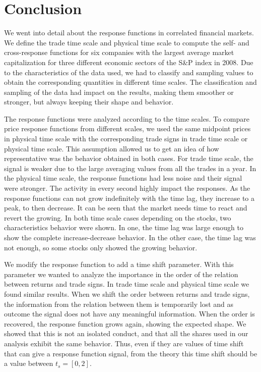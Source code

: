 \section{Conclusion}\label{sec:conclusion}

We went into detail about the response functions in correlated financial
markets. We define the trade time scale and physical time scale to compute the
self- and cross-response functions for six companies with the largest average
market capitalization for three different economic sectors of the S\&P index
in 2008.
Due to the characteristics of the data used, we had to classify and sampling
values to obtain the corresponding quantities in different time scales.
The classification and sampling of the data had impact on the results, making
them smoother or stronger, but always keeping their shape and behavior.

The response functions were analyzed according to the time scales. To compare
price response functions from different scales, we used the same midpoint
prices in physical time scale with the corresponding trade signs in trade time
scale or physical time scale. This assumption allowed us to get an idea of how
representative was the behavior obtained in both cases. For trade time scale,
the signal is weaker due to the large averaging values from all the trades in a
year. In the physical time scale, the response functions had less noise and
their signal were stronger. The activity in every second highly impact the
responses. As the response functions can not grow indefinitely with the time
lag, they increase to a peak, to then decrease. It can be seen that the market
needs time to react and revert the growing. In both time scale cases depending
on the stocks, two characteristics behavior were shown. In one, the time lag
was large enough to show the complete increase-decrease behavior. In the other
case, the time lag was not enough, so some stocks only showed the growing
behavior.

We modify the response function to add a time shift parameter. With this
parameter we wanted to analyze the importance in the order of the relation
between returns and trade signs. In trade time scale and physical time scale we
found similar results. When we shift the order between returns and trade signs,
the information from the relation between them is temporarily lost and as
outcome the signal does not have any meaningful information. When the order is
recovered, the response function grows again, showing the expected shape.
We showed that this is not an isolated conduct, and that all the shares used in
our analysis exhibit the same behavior. Thus, even if they are values of time
shift that can give a response function signal, from the theory this time shift
should be a value between $t_{s} = [0,2]$.

